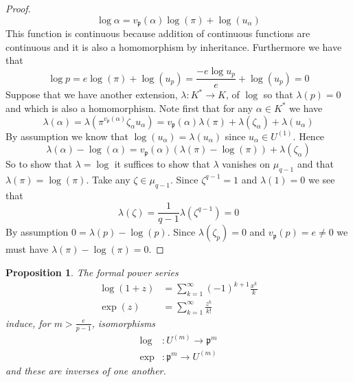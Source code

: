 \documentclass{article}
\newtheorem{proposition}{Proposition}[section]
\newcommand{\mfrak}[1]{\mathfrak{#1}}
\begin{document}
\begin{proof}
    $$\log \alpha = v_\mfrak p(\alpha)\log(\pi) + \log(u_\alpha)$$
    This function is continuous because addition of continuous functions are continuous and it is also a homomorphism by inheritance. Furthermore we have that
    $$\log p = e\log(\pi) + \log(u_p) = \frac{-e\log u_p}{e} + \log(u_p) = 0 $$
    Suppose that we have another extension, $\lambda : K^* \to K$, of $\log$ so that $\lambda(p) = 0$ and which is also a homomorphism. Note first that for any $\alpha \in K^*$ we have
    $$\lambda(\alpha) = \lambda(\pi^{v_\mfrak p(\alpha)}\zeta_\alpha u_\alpha) = {v_\mfrak p(\alpha)}\lambda(\pi) + \lambda(\zeta_\alpha) + \lambda(u_\alpha)$$ 
    By assumption we know that $\log(u_\alpha) = \lambda(u_\alpha)$ since $u_\alpha \in U^{(1)}$. Hence 
    $$\lambda(\alpha) - \log(\alpha) = {v_\mfrak p(\alpha)}(\lambda(\pi)-\log(\pi))  + \lambda(\zeta_\alpha)$$
    So to show that $\lambda = \log$ it suffices to show that $\lambda$ vanishes on $\mu_{q-1}$ and that $\lambda(\pi) = \log(\pi)$. Take any $\zeta \in \mu_{q-1}$. Since $\zeta^{q-1} = 1$ and $\lambda(1) = 0$ we see that
    $$\lambda(\zeta) = \frac{1}{q-1}\lambda(\zeta^{q-1}) = 0$$
    By assumption $0 = \lambda(p) - \log(p)$. Since $\lambda(\zeta_p) = 0$ and $v_\mfrak p(p) = e \neq 0$ we must have $\lambda(\pi) - \log(\pi) = 0$.
\end{proof}
\begin{proposition}
    The formal power series 
    \begin{align*}
        \log(1+z) &= \sum_{k = 1}^\infty (-1)^{k+1}\frac{x^k}{k} \\
        \exp(z) &= \sum_{k = 1}^\infty \frac{z^k}{k!} 
    \end{align*}
    induce, for $m > \frac{e}{p-1}$, isomorphisms
    \begin{align*}
        \log &: U^{(m)} \to \mfrak p^m \\ 
        \exp &: \mfrak p^m \to U^{(m)}
    \end{align*}
    and these are inverses of one another.
\end{proposition}
\end{document}
